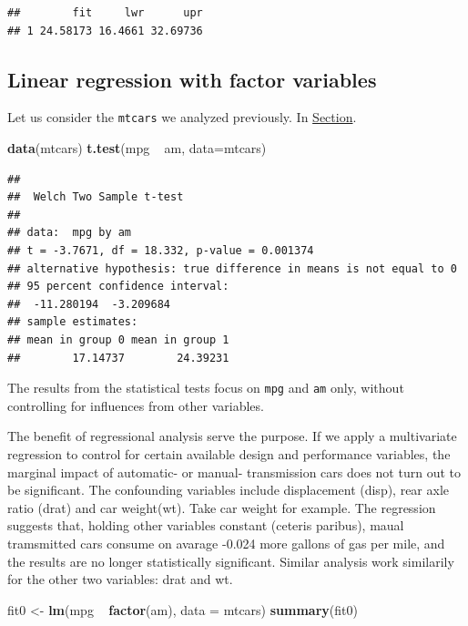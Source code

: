 \documentclass[]{article}
\newenvironment{Shaded}{\begin{snugshade}}{\end{snugshade}}
\newcommand{\KeywordTok}[1]{\textcolor[rgb]{0.13,0.29,0.53}{\textbf{{#1}}}}
\newcommand{\DataTypeTok}[1]{\textcolor[rgb]{0.13,0.29,0.53}{{#1}}}
\newcommand{\StringTok}[1]{\textcolor[rgb]{0.31,0.60,0.02}{{#1}}}
\newcommand{\NormalTok}[1]{{#1}}
\numberwithin{equation}{section}
\begin{document}
\begin{verbatim}
##        fit     lwr      upr
## 1 24.58173 16.4661 32.69736
\end{verbatim}

\subsection{Linear regression with factor
variables}\label{linear-regression-with-factor-variables}

Let us consider the \texttt{mtcars} we analyzed previously. In
\protect\hyperlink{population-mean-between-two-independent-samples}{Section}.

\begin{Shaded}
\begin{Highlighting}[]
\KeywordTok{data}\NormalTok{(mtcars)}
\KeywordTok{t.test}\NormalTok{(mpg ~}\StringTok{ }\NormalTok{am, }\DataTypeTok{data=}\NormalTok{mtcars) }
\end{Highlighting}
\end{Shaded}

\begin{verbatim}
## 
##  Welch Two Sample t-test
## 
## data:  mpg by am
## t = -3.7671, df = 18.332, p-value = 0.001374
## alternative hypothesis: true difference in means is not equal to 0
## 95 percent confidence interval:
##  -11.280194  -3.209684
## sample estimates:
## mean in group 0 mean in group 1 
##        17.14737        24.39231
\end{verbatim}

The results from the statistical tests focus on \texttt{mpg} and
\texttt{am} only, without controlling for influences from other
variables.

The benefit of regressional analysis serve the purpose. If we apply a
multivariate regression to control for certain available design and
performance variables, the marginal impact of automatic- or manual-
transmission cars does not turn out to be significant. The confounding
variables include displacement (disp), rear axle ratio (drat) and car
weight(wt). Take car weight for example. The regression suggests that,
holding other variables constant (ceteris paribus), maual tramsmitted
cars consume on avarage -0.024 more gallons of gas per mile, and the
results are no longer statistically significant. Similar analysis work
similarily for the other two variables: drat and wt.

\begin{Shaded}
\begin{Highlighting}[]
\NormalTok{fit0 <-}\StringTok{ }\KeywordTok{lm}\NormalTok{(mpg ~}\StringTok{ }\KeywordTok{factor}\NormalTok{(am), }\DataTypeTok{data =} \NormalTok{mtcars)}
\KeywordTok{summary}\NormalTok{(fit0)}
\end{Highlighting}
\end{Shaded}
\end{document}
